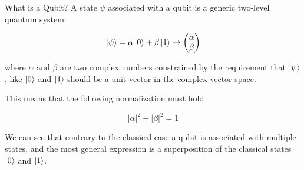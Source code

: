 \documentclass[11p,aspectratio=169]{beamer}
\begin{document}
\begin{frame}{What is a Qubit?}
    A state $\psi$ associated with a qubit is a generic two-level
    quantum system:

    $$ \ket{\psi} = \alpha \ket{0} + \beta \ket{1} \rightarrow 
    \begin{pmatrix}
        \alpha \\ 
        \beta
    \end{pmatrix}$$

    where $\alpha$ and $\beta$  are two complex numbers constrained
    by the requirement that $\ket{\psi}$, like 
    $\ket{0}$ and $\ket{1}$ should be a unit vector
    in the complex vector space. 
    
    This means that the 
    following normalization must hold
    
    $$|\alpha|^2 + |\beta|^2 = 1$$

    We can see that contrary to the classical case a qubit is associated
    with multiple states, and the most general expression is a superposition
    of the classical states $\ket{0}$ and $\ket{1}$.

\end{frame}
\end{document}
